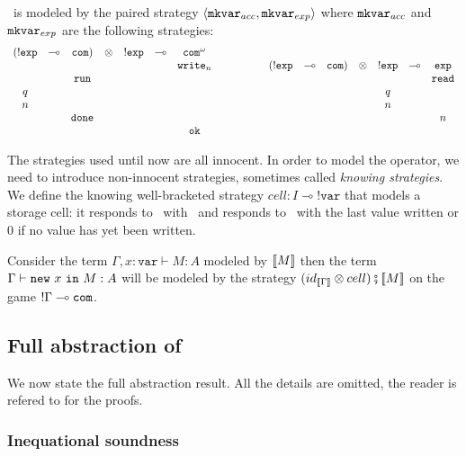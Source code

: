\iamkvar\ is modeled by the paired strategy $\langle \texttt{mkvar}_{acc} , \texttt{mkvar}_{exp}
\rangle$ where $\texttt{mkvar}_{acc}$ and $\texttt{mkvar}_{exp}$ are the following strategies:
$$
\begin{array}{ccccccc}
(\mathtt{!exp} & \multimap & \mathtt{com}) & \otimes & !\mathtt{exp} & \multimap & \mathtt{com}^\omega\\
&&&&&&\texttt{write}_n\\
&&\texttt{run}\\
q\\
n\\
&&\texttt{done} \\
&&&&&&\texttt{ok}
\end{array}
\hspace{1.5cm}
\begin{array}{ccccccc}
(\mathtt{!exp} & \multimap & \mathtt{com}) & \otimes & !\mathtt{exp} & \multimap & \mathtt{exp}\\
&&&&&&\texttt{read}\\
&&&&q\\
&&&&n\\
&&&&&&n
\end{array}
$$


The strategies used until now are all innocent. In order to model the \ianew operator, we need to introduce non-innocent strategies, sometimes called
\emph{knowing strategies}. We define the knowing well-bracketed strategy $cell : I \multimap !\mathtt{var}$ that models a storage cell: it responds to \iawrite\
with \iaok\ and responds
to \iaread\ with the last value written or $0$ if no value has yet been written.

Consider the term $\Gamma,x:\mathtt{var} \vdash M : A$ modeled by ${[\![ M ]\!]}$ then the term
 $\Gamma \vdash \texttt{new}\ x\ \texttt{in}\ M : A$  will be modeled by the strategy $(id_{{[\![ \Gamma ]\!]}} \otimes cell) \fatsemi {[\![M ]\!]}$ on the game
 $!\Gamma \multimap \texttt{com}$.

\subsection{Full abstraction of \ialgol}

We now state the full abstraction result. All the details are omitted, the reader is refered
to \cite{abramsky:game-semantics-tutorial,AM97a} for the proofs.

\subsubsection{Inequational soundness}

